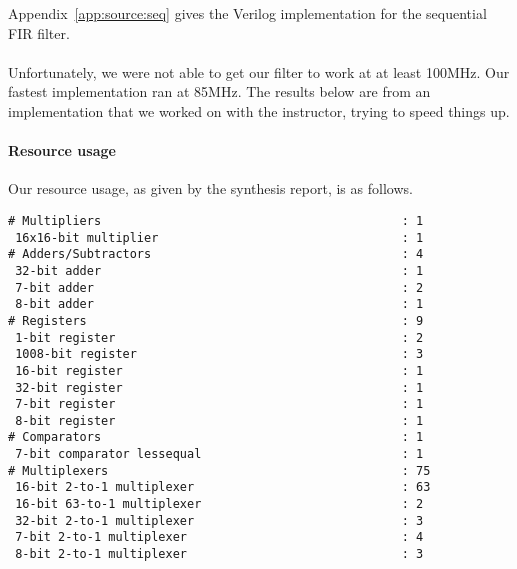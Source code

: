 
\seqfilter
Appendix~\ref{app:source:seq} gives the Verilog implementation for the sequential FIR filter.

\paragraph{}
Unfortunately, we were not able to get our filter to work at at least 100MHz.
Our fastest implementation ran at 85MHz.
The results below are from an implementation that we worked on with the instructor, trying to speed things up.

\paragraph{Resource usage}
Our resource usage, as given by the synthesis report, is as follows.

\begin{verbatim}
# Multipliers                                          : 1
 16x16-bit multiplier                                  : 1
# Adders/Subtractors                                   : 4
 32-bit adder                                          : 1
 7-bit adder                                           : 2
 8-bit adder                                           : 1
# Registers                                            : 9
 1-bit register                                        : 2
 1008-bit register                                     : 3
 16-bit register                                       : 1
 32-bit register                                       : 1
 7-bit register                                        : 1
 8-bit register                                        : 1
# Comparators                                          : 1
 7-bit comparator lessequal                            : 1
# Multiplexers                                         : 75
 16-bit 2-to-1 multiplexer                             : 63
 16-bit 63-to-1 multiplexer                            : 2
 32-bit 2-to-1 multiplexer                             : 3
 7-bit 2-to-1 multiplexer                              : 4
 8-bit 2-to-1 multiplexer                              : 3
\end{verbatim}


